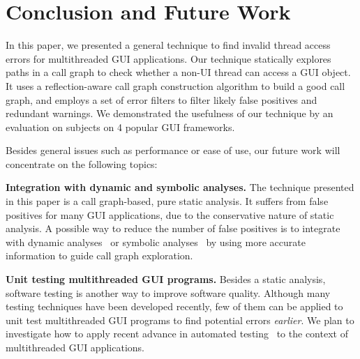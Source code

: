 \section{Conclusion and Future Work}

In this paper, we presented a general technique to find invalid
thread access errors for multithreaded GUI applications. 
Our technique statically explores paths in a call graph to check
whether a non-UI thread can access a GUI object.
It uses a reflection-aware call graph construction algorithm
to build a good call graph, and employs a set of error
filters to filter likely false positives and redundant warnings.
We demonstrated the usefulness of our technique
by an evaluation on \subnum subjects on 4 popular GUI
frameworks. 


Besides general issues such as performance or ease of use, our future
work will concentrate on the following topics:

\textbf{Integration with dynamic and symbolic analyses.} The technique 
presented in this paper is a call graph-based, pure static analysis. 
It suffers from false positives for many GUI applications,
due to the conservative nature of static analysis.
A possible way to reduce the number of false
positives is to integrate with
dynamic analyses~\cite{Jiang:2008:PPS:1453101.1453110}%
or symbolic analyses~\cite{xie05:symstra, Pasareanu:2011, halfond09issta, BMF97}
by using more accurate information to guide call graph exploration.

\textbf{Unit testing multithreaded GUI programs.} Besides
a static analysis,  software testing is another
way to improve software quality.  Although many
testing techniques have been developed recently, few of them can be applied
to unit test multithreaded GUI programs to find potential errors \textit{earlier}. We
plan to investigate how to apply recent advance in automated
testing~\cite{Staats:2011:PTO:1985793.1985847, Jagannath:2011:IMU:2025113.2025145, Muccini_Bertolino_Inverardi_2004, Ricca:2001:ATW:381473.381476, Harman:2007}
to the context of multithreaded GUI applications.


